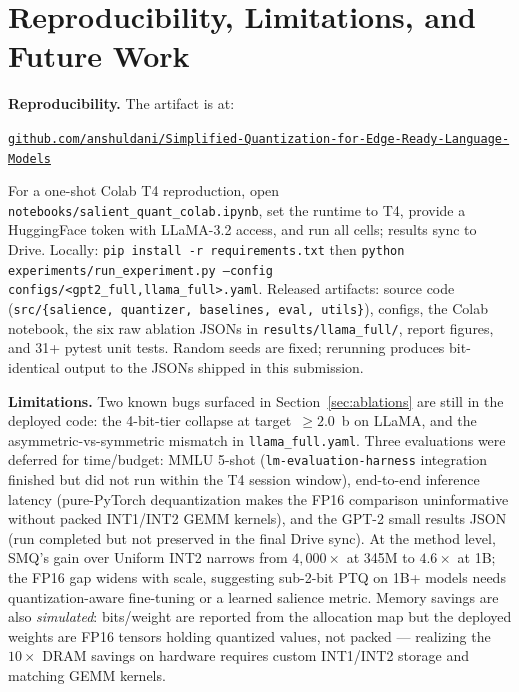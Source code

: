 \documentclass[11pt]{article}
\begin{document}
\section{Reproducibility, Limitations, and Future Work}
\label{sec:limits}

\textbf{Reproducibility.} The artifact is at:
\begin{center}\vspace{-0.4em}
\href{https://github.com/anshuldani/Simplified-Quantization-for-Edge-Ready-Language-Models}{\small\texttt{github.com/anshuldani/Simplified-Quantization-for-Edge-Ready-Language-Models}}
\vspace{-0.2em}\end{center}
For a one-shot Colab T4 reproduction, open
\texttt{notebooks/salient\_quant\_colab.ipynb}, set the runtime to T4, provide a
HuggingFace token with LLaMA-3.2 access, and run all cells; results sync to Drive.
Locally:
\texttt{pip install -r requirements.txt} then
\texttt{python experiments/run\_experiment.py --config configs/<gpt2\_full,llama\_full>.yaml}.
Released artifacts: source code (\texttt{src/\{salience, quantizer, baselines, eval, utils\}}),
configs, the Colab notebook, the six raw ablation JSONs in \texttt{results/llama\_full/},
report figures, and 31+ pytest unit tests.
Random seeds are fixed; rerunning produces bit-identical output to the JSONs shipped in
this submission.

\textbf{Limitations.}
Two known bugs surfaced in Section~\ref{sec:ablations} are still in the deployed code: the
4-bit-tier collapse at target~$\geq 2.0$~b on LLaMA, and the asymmetric-vs-symmetric
mismatch in \texttt{llama\_full.yaml}.
Three evaluations were deferred for time/budget: MMLU 5-shot
(\texttt{lm-}\linebreak[1]\texttt{evaluation-}\linebreak[1]\texttt{harness} integration finished but did not run within the T4 session
window), end-to-end inference latency (pure-PyTorch dequantization makes the FP16
comparison uninformative without packed INT1/INT2 GEMM kernels), and the GPT-2 small
results JSON (run completed but not preserved in the final Drive sync).
At the method level, SMQ's gain over Uniform INT2 narrows from $4{,}000\times$ at 345M to
$4.6\times$ at 1B; the FP16 gap widens with scale, suggesting sub-2-bit PTQ on 1B+ models
needs quantization-aware fine-tuning or a learned salience metric.
Memory savings are also \emph{simulated}: bits/weight are reported from the allocation
map but the deployed weights are FP16 tensors holding quantized values, not packed ---
realizing the $10\times$ DRAM savings on hardware requires custom INT1/INT2 storage and
matching GEMM kernels.
\end{document}
